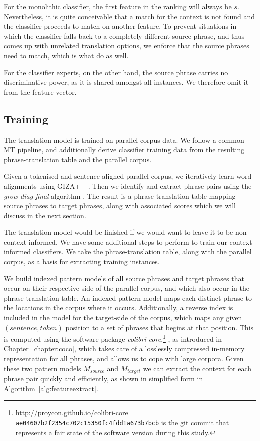 For the monolithic classifier, the first feature in the ranking will always be
$s$. Nevertheless, it is quite conceivable that a match for the context is not
found and the classifier proceeds to match on another feature. To prevent
situations in which the classifier falls back to a completely different source
phrase, and thus comes up with unrelated translation options, we enforce that
the source phrases need to match, which is what \cite{Stroppa+07} do as
well.

For the classifier experts, on the other hand, the source
phrase carries no discriminative power, as it is shared amongst all instances. We
therefore omit it from the feature vector.

\subsection{Training}

The translation model is trained on parallel corpus data. We follow a common MT
pipeline, and additionally derive classifier training data from the
resulting phrase-translation table and the parallel corpus.

Given a tokenised and sentence-aligned parallel corpus, we iteratively learn
word alignments using GIZA++ \citep{GIZA}. Then we identify and extract phrase
pairs using the {\em grow-diag-final}\/ algorithm \citep{OchNey2003}. The
result is a phrase-translation table mapping source phrases to target
phrases, along with associated scores which we will discuss in the next
section. %

The translation model would be finished if we would want to leave it to be
non-context-informed. We have some additional steps to perform to train our
context-informed classifiers. We take the phrase-translation table, along with
the parallel corpus, as a basis for extracting training instances.

We build indexed pattern models of all source phrases and target phrases that
occur on their respective side of the parallel corpus, and which also occur in
the phrase-translation table. An indexed pattern model maps each distinct
phrase to the locations in the corpus where it occurs.  Additionally, a reverse
index is included in the model for the target-side of the corpus, which maps
any given $(sentence, token)$ position to a set of phrases that begins at that
position.  This is computed using the software package
\emph{colibri-core},\footnote{\url{http://proycon.github.io/colibri-core} \\ \texttt{ae04607b2f2354c702c15350fc4fdd1a673b7bcb} is the git commit that represents a fair state of the software version during this study.}
, as introduced in Chapter~\ref{chapter:coco},  which takes care of a losslessly compressed in-memory representation for all
phrases, and allows us to cope with large corpora. Given these two pattern
models $M_{source}$ and $M_{target}$ we can extract the context for each phrase
pair quickly and efficiently, as shown in simplified form in
Algorithm~\ref{alg:featureextract}.

